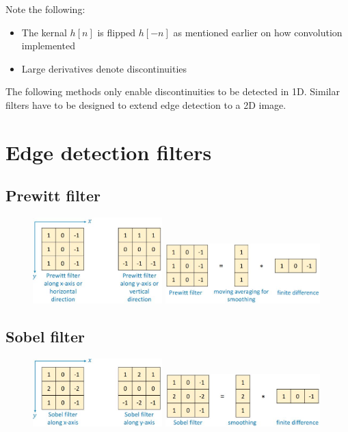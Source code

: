 \documentclass{report}
\begin{document}
Note the following:
\begin{itemize}
    \item The kernal $h[n]$ is flipped $h[-n]$ as mentioned earlier on how
    convolution implemented
    \item Large derivatives denote discontinuities 
\end{itemize}

The following methods only enable discontinuities to be detected in 1D. Similar
filters have to be designed to extend edge detection to a 2D image.

\section{Edge detection filters}

\subsection{Prewitt filter}
\begin{figure}[h]
    \centering
    \includegraphics[width=5cm]{Prewitt.JPG}
    \hspace{2cm}
    \includegraphics[width=6cm]{Prewitt separable.JPG}
\end{figure}

\subsection{Sobel filter}
\begin{figure}[h]
    \centering
    \includegraphics[width=5cm]{Sobel 1.JPG}
    \hspace{2cm}
    \includegraphics[width=6cm]{Sobel 2.JPG}
\end{figure}
\end{document}
